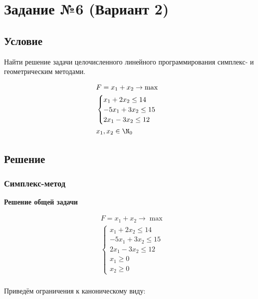 \section{Задание №6 (Вариант 2)} \label{06-lab}

\subsection{Условие} \label{06-lab-condition}

Найти решение задачи целочисленного линейного программирования
симплекс- и геометрическим методами.

\begin{align*}
     & F = x_1 + x_2 \to \max \\
     & \begin{cases}
           x_1 + 2x_2 \leq 14   \\
           -5x_1 + 3x_2 \leq 15 \\
           2x_1 - 3x_2 \leq 12
       \end{cases}   \\
     & x_1, x_2 \in \N_0
\end{align*}

\subsection{Решение} \label{06-lab-solution}

\subsubsection{Симплекс-метод} \label{06-lab-solution-simplex}

\textbf{Решение общей задачи}

\begin{align*}
     & F = x_1 + x_2 \to \max \\
     & \begin{cases}
           x_1 + 2x_2 \leq 14   \\
           -5x_1 + 3x_2 \leq 15 \\
           2x_1 - 3x_2 \leq 12  \\
           x_1 \geq 0           \\
           x_2 \geq 0
       \end{cases}   \\
\end{align*}

Приведём ограничения к каноническому виду:

